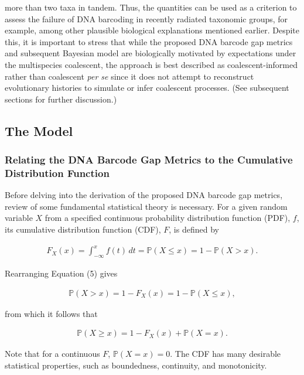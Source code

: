 \documentclass[12pt]{article}
\begin{document}
more than two taxa in tandem. Thus, the quantities can be used as a criterion to assess the failure of DNA barcoding in recently radiated taxonomic groups, for example, among other plausible biological explanations mentioned earlier. Despite this, it is important to stress that while the proposed DNA barcode gap metrics and subsequent Bayesian model are biologically motivated by expectations under the multispecies coalescent, the approach is best described as coalescent-informed rather than coalescent \textit{per se} since it does not attempt to reconstruct evolutionary histories to simulate or infer coalescent processes. (See subsequent sections for further discussion.)


\subsection{The Model}

\subsubsection{Relating the DNA Barcode Gap Metrics to the Cumulative Distribution Function}

Before delving into the derivation of the proposed DNA barcode gap metrics, review of some fundamental statistical theory is necessary. For a given random variable $X$ from a specified continuous probability distribution function (PDF), $f$, its cumulative distribution function (CDF), $F$, is defined by

\begin{align}
F_X(x) = \int_{-\infty}^{x} f(t) \,dt = \mathbb{P}(X \leq x) = 1 - \mathbb{P}(X > x). 
\end{align}

\noindent Rearranging Equation (5) gives

\begin{align}
\mathbb{P}(X > x) = 1 - F_X(x) = 1 - \mathbb{P}(X \leq x) ,
\end{align}

\noindent from which it follows that

\begin{align}
\mathbb{P}(X \geq x) = 1 - F_X(x) + \mathbb{P}(X = x).
\end{align}

\noindent Note that for a continuous $F$, $\mathbb{P}(X = x) = 0$. The CDF has many desirable statistical properties, such as boundedness, continuity, and monotonicity. 
\end{document}
